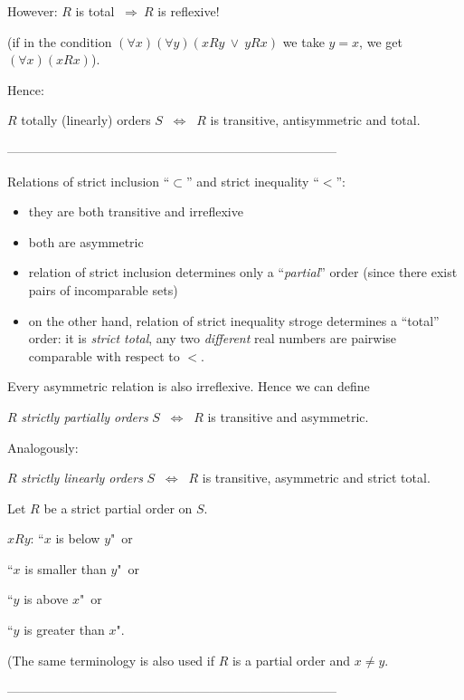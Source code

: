 \documentclass[11pt,paper=b5,footinclude,headinclude]{scrbook} %
\def\ali {{~\vee~}}
\def\sledi {{~\Rightarrow~}}
\def\cee {{~\Leftrightarrow~}}
\theoremstyle{remark}
\theoremstyle{definition} %
\theoremstyle{theorem} %
\begin{document}
\bigskip
However: $R$ is total  $\sledi R$ is reflexive!

(if in the condition $(\forall x)(\forall y)(xRy \ali yRx)$ we take $y = x$, we get
$(\forall x)(xRx)$).

Hence:

$R$ {totally (linearly) orders} $S$ $\cee$ $R$ is transitive, antisymmetric and total.

\bigskip

------------------------------------------------------------------------------


\bigskip

Relations of strict inclusion ``$\subset$'' and strict inequality ``$<$'':
\begin{itemize}
  \item they are both transitive and irreflexive
  \item both are asymmetric
  \item relation of strict inclusion determines only a ``{\em partial}'' order (since there exist pairs of incomparable sets)
  \item on the other hand, relation of strict inequality stroge determines a ``total'' order: it is {\em strict total}, any two {\em different} real numbers are pairwise comparable with respect to $<$.
\end{itemize}

Every asymmetric relation is also irreflexive. Hence we can define

$R$ {\em strictly partially orders} $S$ $\cee$ $R$ is transitive and asymmetric.

\bigskip

Analogously:

\medskip
$R$ {\em strictly linearly orders} $S$ $\cee$ $R$ is transitive, asymmetric and strict total.

\bigskip

Let $R$ be a strict partial order on $S$.

$xRy$: ``$x$ is below $y$"~or

``$x$ is smaller than $y$"~or

``$y$ is above $x$"~or

``$y$ is greater than $x$".

(The same terminology is also used if $R$ is a partial order and $x\neq y$.

------------------------------------------------------------------------------
\end{document}
